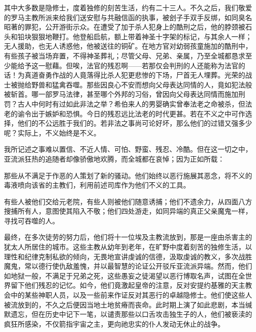 其中大多数是隐修士，度着独修的刻苦生活，约有二十三人。不久之后，我们敬爱的罗马主教所派来给我们送安慰与共融信函的执事，被刽子手双手反绑，如同臭名昭著的罪犯，公开游街示众。在遭受了加于杀人犯身上的酷刑之后，他的脖颈被石头和铅块狠狠地鞭打。他登船启航，额上带着神圣十字架的标记，与其余人一样；无人援助，也无人诱惑他，他被送往的铜矿。在地方官对幼弱孩童施加的酷刑中，有些孩子被当场弃置，不得神圣葬礼；尽管父母、兄弟、亲属，乃至全城都恳求至少能给予这一慰藉。但唉，法官的残忍啊——若那仅会判刑的人还能称为法官的话！为真道奋勇作战的人竟落得比杀人犯更悲惨的下场，尸首无人埋葬。光荣的战士被抛给野兽和猛禽吞噬。那些因良心不安而想向父母表达同情的人，竟如犯法般被斩首。哪一部罗马法律，甚至哪个外邦的习俗，曾因向父母表达同情而施加刑罚？古人中何时有过如此非法之举？希伯来人的男婴确实曾奉法老之命被杀，但法老的谕令出于嫉妒和恐惧。今日的残忍远比法老的时代更甚。若在不义之中可作选择，他们的不公远胜于我们的。若非法之事尚可论好坏，那么他们的过错又强多少呢？实际上，不义始终是不义。\par

我所记述之事难以置信、不近人情、可怕、野蛮、残忍、冷酷。但在这一切之中，亚流派狂热的追随者却像骄傲地欢腾，而全城都在哀悼；因为正如所载：\par

那些从不满足于作恶的人策划了新的骚动。他们始终以恶行施展其恶念，将不义的毒液喷向该省的主教们，利用前述司库作为他们不义的工具。\par

有些人被他们交给元老院，有些人则被他们随意诱捕；他们不遗余力，从四面八方搜捕所有人，意图使其陷入不敬；他们四处游走，如同异端的真正父亲魔鬼一样，寻找可吞噬的人。\par

最终，在多次徒劳的努力后，他们将十一位埃及主教流放到，那是一座由杀害主的犹太人所居住的城市。这些主教从幼年到老年，在旷野中度着刻苦的独修生活，以理性和纪律克制私欲的倾向，无畏地宣讲虔诚的信德，汲取虔诚的教义，多次战胜魔鬼，常以德行使仇敌羞愧，并以最智慧的论证公开驳斥亚流派异端。然而，他们如地狱一般，不满足于兄弟之死，这些愚妄之徒渴望以恶行博取名声，试图在全世界留下他们残忍的记忆。如今，他们竟激起皇帝的注意，反对安提约基雅的天主教会中的某些神职人员，以及一些前来作证反对其恶行的卓越隐修士。他们使这些人被流放到的，不久之后便因当地土地贫瘠而丧命。此时期上演了如此悲剧，本当缄默遗忘，但在历史中记下一笔，以谴责那些以口舌攻击独生子的人，他们被亵渎的疯狂所感染，不仅箭指宇宙之主，更向祂忠实的仆人发动无休止的战争。\par

